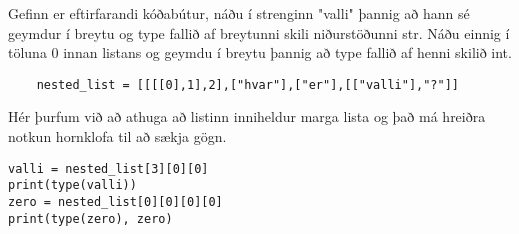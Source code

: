 Gefinn er eftirfarandi kóðabútur, náðu í strenginn "valli" þannig að hann sé geymdur í breytu og type fallið af breytunni skili niðurstöðunni str.
Náðu einnig í töluna 0 innan listans og geymdu í breytu þannig að type fallið af henni skilið int. 
\begin{exercise}\label{lst4}
	\begin{lstlisting}
	nested_list = [[[[0],1],2],["hvar"],["er"],[["valli"],"?"]]\end{lstlisting}
\end{exercise}
\begin{Answer}[ref={lst4}]
Hér þurfum við að athuga að listinn inniheldur marga lista og það má hreiðra notkun hornklofa til að sækja gögn.
	\begin{lstlisting}
valli = nested_list[3][0][0]
print(type(valli))
zero = nested_list[0][0][0][0]
print(type(zero), zero)\end{lstlisting}
\end{Answer}

